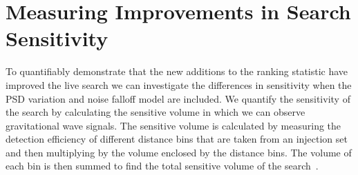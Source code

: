   
  


\section{\label{5:sec:injection-tests}Measuring Improvements in Search Sensitivity}

To quantifiably demonstrate that the new additions to the ranking statistic have improved the live search we can investigate the differences in sensitivity when the PSD variation and noise falloff model are included. We quantify the sensitivity of the search by calculating the sensitive volume in which we can observe gravitational wave signals. The sensitive volume is calculated by measuring the detection efficiency of different distance bins that are taken from an injection set and then multiplying by the volume enclosed by the distance bins. The volume of each bin is then summed to find the total sensitive volume of the search~\cite{rw_snr_eq:2012}.

